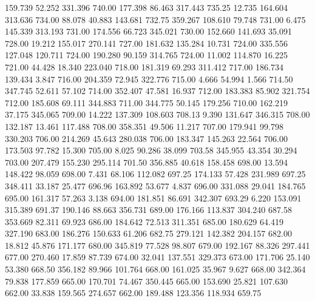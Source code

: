  159.739   52.252  331.396       740.00
 177.398   86.463  317.443       735.25
  12.735  164.604  313.636       734.00
  88.078   40.883  143.681       732.75
 359.267  108.610   79.748       731.00
   6.475  145.339  313.193       731.00
 174.556   66.723  345.021       730.00
 152.660  141.693   35.091       728.00
  19.212  155.017  270.141       727.00
 181.632  135.284   10.731       724.00
 335.556  127.048  120.711       724.00
 190.280   90.159  314.765       724.00
  11.002  114.870   16.225       721.00
  44.428   18.340  223.040       718.00
 181.319   69.293  311.412       717.00
 186.734  139.434    3.847       716.00
 204.359   72.945  322.776       715.00
   4.666   54.994    1.566       714.50
 347.745   52.611   57.102       714.00
 352.407   47.581   16.937       712.00
 183.383   85.902  321.754       712.00
 185.608   69.111  344.883       711.00
 344.775   50.145  179.256       710.00
 162.219   37.175  345.065       709.00
  14.222  137.309  108.603       708.13
   9.390  131.647  346.315       708.00
 132.187   13.461  117.488       708.00
 358.351   49.506   11.217       707.00
 179.941   99.798  330.203       706.00
 214.269   45.643  280.038       706.00
 183.347  145.263   22.564       706.00
 173.503   97.782   15.300       705.00
   8.025   90.286   38.099       703.58
 345.955   43.354   30.294       703.00
 207.479  155.230  295.114       701.50
 356.885   40.618  158.458       698.00
  13.594  148.422   98.059       698.00
   7.431   68.106  112.082       697.25
 174.133   57.428  231.989       697.25
 348.411   33.187   25.477       696.96
 163.892   53.677    4.837       696.00
 331.088   29.041  184.765       695.00
 161.317   57.263    3.138       694.00
 181.851   86.691  342.307       693.29
   6.220  153.091  315.389       691.37
 190.146   88.663  356.731       689.00
 176.166  113.837  304.240       687.58
 353.669   82.311   69.923       686.00
 184.642   72.513  311.351       685.00
 180.629   64.419  327.190       683.00
 186.276  150.633   61.206       682.75
 279.121  142.382  204.157       682.00
  18.812   45.876  171.177       680.00
 345.819   77.528   98.807       679.00
 192.167   88.326  297.441       677.00
 270.460   17.859   87.739       674.00
  32.041  137.551  329.373       673.00
 171.706   25.140   53.380       668.50
 356.182   89.966  101.764       668.00
 161.025   35.967    9.627       668.00
 342.364   79.838  177.859       665.00
 170.701   74.467  350.445       665.00
 153.690   25.821  107.630       662.00
  33.838  159.565  274.657       662.00
 189.488  123.356  118.934       659.75
